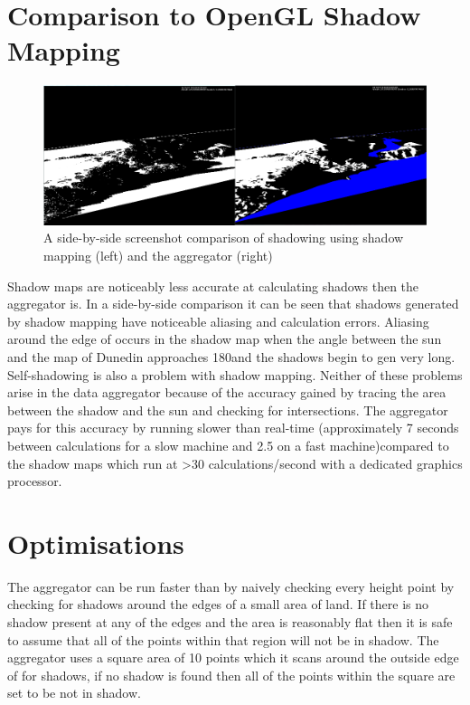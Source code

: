 \documentclass[12pt]{report}
\begin{document}
\section{Comparison to OpenGL Shadow Mapping}
\begin{figure}[h]
\centering
\includegraphics[scale=0.6]{aggregatorvsshadowmapping.png}
\caption{A side-by-side screenshot comparison of shadowing using shadow mapping (left) and the aggregator (right)}
\end{figure}

Shadow maps are noticeably less accurate at calculating shadows then the aggregator is. In a side-by-side comparison it can be seen that shadows generated by shadow mapping have noticeable aliasing and calculation errors. Aliasing  around the edge of occurs in the shadow map when the angle between the sun and the map of Dunedin approaches 180\degree and the shadows begin to gen very long. Self-shadowing is also a problem with shadow mapping. Neither of these problems arise in the data aggregator because of the accuracy gained by tracing the area between the shadow and the sun and checking for intersections. The aggregator pays for this accuracy by running slower than real-time (approximately 7 seconds between calculations for a slow machine and 2.5 on a fast machine)compared to the shadow maps which run at >30 calculations/second with a dedicated graphics processor.\\

\section{Optimisations}
The aggregator can be run faster than by naively checking every height point by checking for shadows around the edges of a small area of land. If there is no shadow present at any of the edges and the area is reasonably flat then it is safe to assume that all of the points within that region will not be in shadow. The aggregator uses a square area of 10 points which it scans around the outside edge of for shadows, if no shadow is found then all of the points within the square are set to be not in shadow.\\
\end{document}
